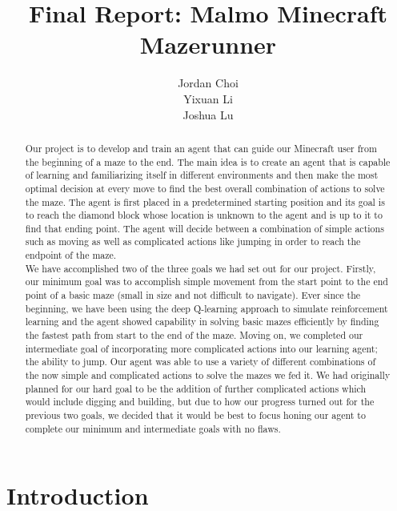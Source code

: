 \documentclass{article}
\title{Final Report: Malmo Minecraft Mazerunner}
\author{%
  Jordan Choi \\
  Yixuan Li \\
  Joshua Lu \\
}
\begin{document}
\maketitle

\begin{abstract}
  Our project is to develop and train an agent that can guide our Minecraft user from the beginning of a maze to the end. The main idea is to create an agent that is capable of learning and familiarizing itself in different environments and then make the most optimal decision at every move to find the best overall combination of actions to solve the maze. The agent is first placed in a predetermined starting position and its goal is to reach the diamond block whose location is unknown to the agent and is up to it to find that ending point. The agent will decide between a combination of simple actions such as moving as well as complicated actions like jumping in order to reach the endpoint of the maze.  \\
We have accomplished two of the three goals we had set out for our project. Firstly, our minimum goal was to accomplish simple movement from the start point to the end point of a basic maze (small in size and not difficult to navigate). Ever since the beginning, we have been using the deep Q-learning approach to simulate reinforcement learning and the agent showed capability in solving basic mazes efficiently by finding the fastest path from start to the end of the maze. Moving on, we completed our intermediate goal of incorporating more complicated actions into our learning agent; the ability to jump. Our agent was able to use a variety of different combinations of the now simple and complicated actions to solve the mazes we fed it. We had originally planned for our hard goal to be the addition of further complicated actions which would include digging and building, but due to how our progress turned out for the previous two goals, we decided that it would be best to focus honing our agent to complete our minimum and intermediate goals with no flaws. 

\end{abstract}

\section{Introduction}
\end{document}
